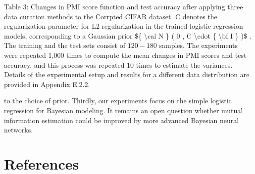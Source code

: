 Table 3: Changes in PMI score function and test accuracy after applying
three data curation methods to the Corrpted CIFAR dataset. C denotes the
regularization parameter for L2 regularization in the trained logistic
regression models, corresponding to a Gaussian prior {\$\{
\textbackslash cal N \} ( 0 , C \textbackslash cdot \{ \textbackslash bf
I \} )\$} . The training and the test sets consist of \(1 2 0 - 1 8 0\)
samples. The experiments were repeated 1,000 times to compute the mean
changes in PMI scores and test accuracy, and this process was repeated
10 times to estimate the variances. Details of the experimental setup
and results for a different data distribution are provided in Appendix
E.2.2.

to the choice of prior. Thirdly, our experiments focus on the simple
logistic regression for Bayesian modeling. It remains an open question
whether mutual information estimation could be improved by more advanced
Bayesian neural networks.

\section{References}\label{references}

